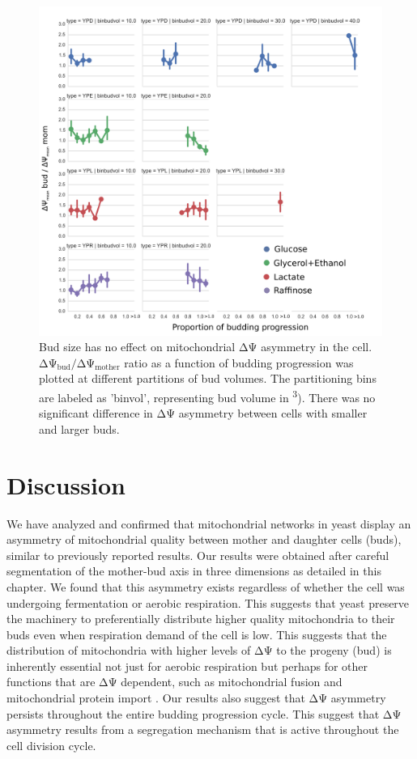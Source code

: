 %
%
\begin{figure}[htp]
	\centering
    \includegraphics[width=.8\textwidth]{frafacet}
    \caption[Bud size has no effect on mitochondrial ΔΨ asymmetry in the cell]{Bud size has no effect on mitochondrial ΔΨ asymmetry in the cell.\\ ΔΨ$_\mathrm{bud}/$ΔΨ$_\mathrm{mother}$ ratio as a function of budding progression was plotted at different partitions of bud volumes. The partitioning bins are labeled as 'binvol', representing bud volume in \si{\micron\cubed}). There was no significant difference in ΔΨ asymmetry between cells with smaller and larger buds.}\label{fig:frafacet}
\end{figure}
%
\section{Discussion}
We have analyzed and confirmed that mitochondrial networks in yeast display an asymmetry of mitochondrial quality between mother and daughter cells (buds), similar to previously reported results. Our results were obtained after careful segmentation of the mother-bud axis in three dimensions as detailed in this chapter. We found that this asymmetry exists regardless of whether the cell was undergoing fermentation or aerobic respiration. This suggests that yeast preserve the machinery to preferentially distribute higher quality mitochondria to their buds even when respiration demand of the cell is low. This suggests that the distribution of mitochondria with higher levels of ΔΨ to the progeny (bud) is inherently essential not just for aerobic respiration but perhaps for other functions that are ΔΨ dependent, such as mitochondrial fusion and mitochondrial protein import \cite{dudek_mitochondrial_2013}. Our results also suggest that ΔΨ asymmetry persists throughout the entire budding progression cycle. This suggest that ΔΨ asymmetry results from a segregation mechanism that is active throughout the cell division cycle.
 
